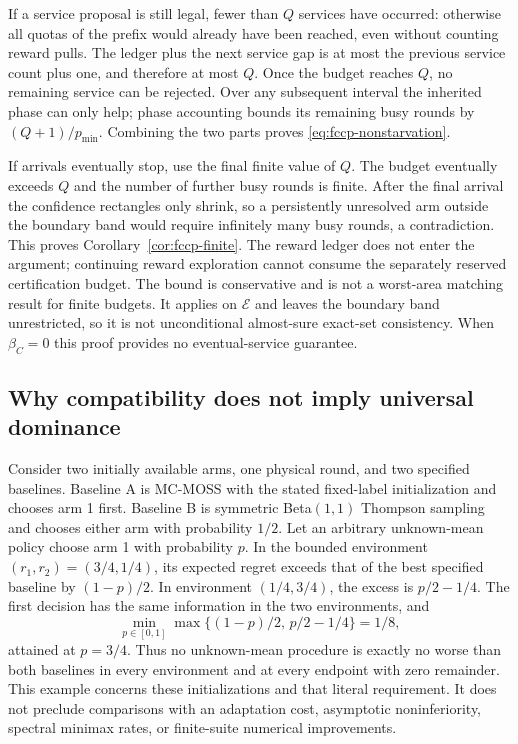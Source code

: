 \documentclass[11pt]{article}
\theoremstyle{remark}
\begin{document}
If a service proposal is still legal, fewer than $Q$ services have
occurred: otherwise all quotas of the prefix would already have been
reached, even without counting reward pulls. The ledger plus the next
service gap is at most the previous service count plus one, and
therefore at most $Q$. Once the budget reaches $Q$, no remaining
service can be rejected. Over any subsequent interval the inherited
phase can only help; phase accounting bounds its remaining busy rounds
by $(Q+1)/p_{\min}$. Combining the two parts proves
\eqref{eq:fccp-nonstarvation}.

If arrivals eventually stop, use the final finite value of $Q$.
The budget eventually exceeds $Q$ and the number of further busy
rounds is finite. After the final arrival the confidence rectangles
only shrink, so a persistently unresolved arm outside the boundary
band would require infinitely many busy rounds, a contradiction.
This proves Corollary~\ref{cor:fccp-finite}. The reward ledger does
not enter the argument; continuing reward exploration cannot consume
the separately reserved certification budget. The bound is
conservative and is not a worst-area matching result for finite
budgets. It applies on $\mathcal E$ and leaves the boundary band
unrestricted, so it is not unconditional almost-sure exact-set
consistency. When $\beta_C=0$ this proof provides no eventual-service
guarantee.

\subsection{Why compatibility does not imply universal dominance}
Consider two initially available arms, one physical round, and two
specified baselines. Baseline A is MC-MOSS with the stated fixed-label
initialization and chooses arm 1 first. Baseline B is symmetric
Beta$(1,1)$ Thompson sampling and chooses either arm with probability
$1/2$. Let an arbitrary unknown-mean policy choose arm 1 with
probability $p$. In the bounded environment $(r_1,r_2)=(3/4,1/4)$,
its expected regret exceeds that of the best specified baseline by
$(1-p)/2$. In environment $(1/4,3/4)$, the excess is $p/2-1/4$.
The first decision has the same information in the two environments,
and
\[
 \min_{p\in[0,1]}\max\{(1-p)/2,\,p/2-1/4\}=1/8,
\]
attained at $p=3/4$. Thus no unknown-mean procedure is exactly no worse
than both baselines in every environment and at every endpoint with
zero remainder. This example concerns these initializations and that
literal requirement. It does not preclude comparisons with an
adaptation cost, asymptotic noninferiority, spectral minimax rates,
or finite-suite numerical improvements.
\end{document}
